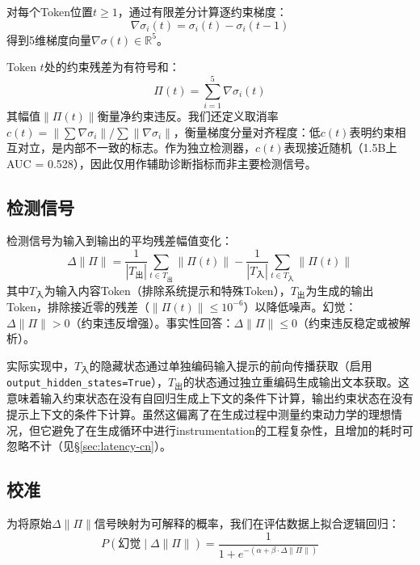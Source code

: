 \documentclass[11pt]{ctexart}
\begin{document}
对每个Token位置$t \geq 1$，通过有限差分计算逐约束梯度：
\begin{equation}
\nabla\sigma_i(t) = \sigma_i(t) - \sigma_i(t-1)
\end{equation}
得到5维梯度向量$\nabla\sigma(t) \in \mathbb{R}^5$。

Token $t$处的约束残差为有符号和：
\begin{equation}
\Pi(t) = \sum_{i=1}^{5} \nabla\sigma_i(t)
\end{equation}
其幅值$\|\Pi(t)\|$衡量净约束违反。我们还定义取消率$c(t) = \|\sum \nabla\sigma_i\| / \sum \|\nabla\sigma_i\|$，衡量梯度分量对齐程度：低$c(t)$表明约束相互对立，是内部不一致的标志。作为独立检测器，$c(t)$表现接近随机（1.5B上AUC = 0.528），因此仅用作辅助诊断指标而非主要检测信号。

\subsection{检测信号}

检测信号为输入到输出的平均残差幅值变化：
\begin{equation}
\Delta\|\Pi\| = \frac{1}{|T_{\text{出}}|} \sum_{t \in T_{\text{出}}} \|\Pi(t)\| - \frac{1}{|T_{\text{入}}|} \sum_{t \in T_{\text{入}}} \|\Pi(t)\|
\label{eq:delta}
\end{equation}
其中$T_{\text{入}}$为输入内容Token（排除系统提示和特殊Token），$T_{\text{出}}$为生成的输出Token，排除接近零的残差（$\|\Pi(t)\| \leq 10^{-6}$）以降低噪声。幻觉：$\Delta\|\Pi\| > 0$（约束违反增强）。事实性回答：$\Delta\|\Pi\| \leq 0$（约束违反稳定或被解析）。

实际实现中，$T_{\text{入}}$的隐藏状态通过单独编码输入提示的前向传播获取（启用\texttt{output\_hidden\_states=True}），$T_{\text{出}}$的状态通过独立重编码生成输出文本获取。这意味着输入约束状态在没有自回归生成上下文的条件下计算，输出约束状态在没有提示上下文的条件下计算。虽然这偏离了在生成过程中测量约束动力学的理想情况，但它避免了在生成循环中进行instrumentation的工程复杂性，且增加的耗时可忽略不计（见\S\ref{sec:latency-cn}）。

\subsection{校准}

为将原始$\Delta\|\Pi\|$信号映射为可解释的概率，我们在评估数据上拟合逻辑回归：
\begin{equation}
P(\text{幻觉} \mid \Delta\|\Pi\|) = \frac{1}{1 + e^{-(\alpha + \beta \cdot \Delta\|\Pi\|)}}
\label{eq:calibration}
\end{equation}
\end{document}
